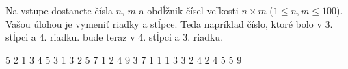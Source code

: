 




Na vstupe dostanete čísla $n$, $m$ a obdĺžnik čísel veľkosti $n\times m$ ($1\leq n,m \leq 100$).
Vašou úlohou je vymeniť riadky a stĺpce. Teda napríklad číslo, ktoré bolo v 3. stĺpci a 4. riadku.
bude teraz v 4. stĺpci a 3. riadku.

 5
2 1 3 4 5
3 1 3 2 5
7 1 2 4 9
 3 7
1 1 1
3 3 2
4 2 4
5 5 9
\koniec


